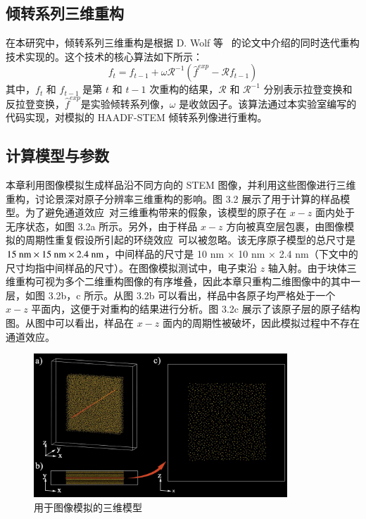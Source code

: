 \subsection{倾转系列三维重构}
在本研究中，倾转系列三维重构是根据 D. Wolf 等~\cite{Wolf2014} 的论文中介绍的同时迭代重构技术实现的。这个技术的核心算法如下所示：
\begin{equation}
f_t=f_{t-1}+\omega\mathcal{R}^{-1}\left(\hat{f}^{exp}-\mathcal{R}f_{t-1}\right)
\end{equation}
其中，$f_t$ 和 $f_{t-1}$ 是第 $t$ 和 $t-1$ 次重构的结果，$\mathcal{R}$ 和 $\mathcal{R}^{-1}$ 分别表示拉登变换和反拉登变换，$\hat{f}^{exp}$是实验倾转系列像，$\omega$ 是收敛因子。该算法通过本实验室编写的代码实现，对模拟的 HAADF-STEM 倾转系列像进行重构。

\subsection{计算模型与参数}
本章利用图像模拟生成样品沿不同方向的 STEM 图像，并利用这些图像进行三维重构，讨论景深对原子分辨率三维重构的影响。图  3.2 展示了用于计算的样品模型。为了避免通道效应~\cite{WangA2010,Sinkler1999}对三维重构带来的假象，该模型的原子在 $x-z$ 面内处于无序状态，如图 3.2a 所示。另外，由于样品 $x-z$ 方向被真空层包裹，由图像模拟的周期性重复假设所引起的环绕效应~\cite{Kirkland2010}可以被忽略。该无序原子模型的总尺寸是 $15 \textnormal{ nm} \times 15 \textnormal{ nm} \times 2.4 \textnormal{ nm}$，中间样品的尺寸是 10 nm $\times$ 10 nm $\times$ 2.4 nm（下文中的尺寸均指中间样品的尺寸）。在图像模拟测试中，电子束沿 $z$ 轴入射。由于块体三维重构可视为多个二维重构图像的有序堆叠，因此本章只重构二维图像中的其中一层，如图 3.2b，c 所示。从图 3.2b 可以看出，样品中各原子均严格处于一个 $x-z$ 平面内，这便于对重构的结果进行分析。图 3.2c 展示了该原子层的原子结构图。从图中可以看出，样品在 $x-z$ 面内的周期性被破坏，因此模拟过程中不存在通道效应。

\begin{figure}[H]
	\vspace{\baselineskip}
	\centering
	\includegraphics[width=0.85\textwidth]{../4.1/41}
	\caption{用于图像模拟的三维模型}\label{fig:41}
	\song{}
\end{figure}

